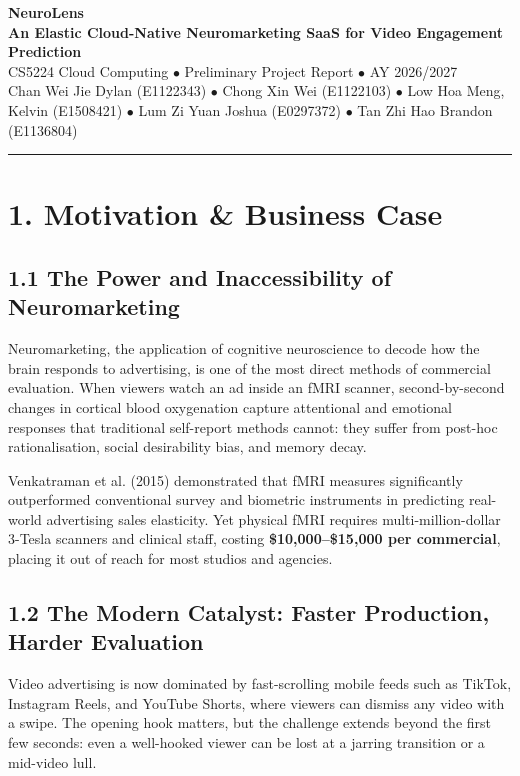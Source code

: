 \documentclass[10pt,a4paper]{article}
\begin{document}
\begin{center}
    {\LARGE \textbf{\textsf{NeuroLens}}}\\[4pt]
    {\large \textbf{\textsf{\textcolor[HTML]{0284c7}{An Elastic Cloud-Native Neuromarketing SaaS for Video Engagement Prediction}}}}\\[6pt]
    {\footnotesize \textsf{\textcolor[HTML]{64748b}{CS5224 Cloud Computing $\bullet$ Preliminary Project Report $\bullet$ AY 2026/2027}}}\\[4pt]
    {\footnotesize \textsf{\textcolor[HTML]{64748b}{Chan Wei Jie Dylan (E1122343) $\bullet$ Chong Xin Wei (E1122103) $\bullet$ Low Hoa Meng, Kelvin (E1508421) $\bullet$ Lum Zi Yuan Joshua (E0297372) $\bullet$ Tan Zhi Hao Brandon (E1136804)}}}\\[2pt]
    \rule{\textwidth}{0.4pt}
\end{center}
\vspace{2mm}

\section*{\textsf{1. Motivation \& Business Case}}
\subsection*{\textsf{1.1 The Power and Inaccessibility of Neuromarketing}}
Neuromarketing, the application of cognitive neuroscience to decode how the brain responds to advertising, is one of the most direct methods of commercial evaluation. When viewers watch an ad inside an fMRI scanner, second-by-second changes in cortical blood oxygenation capture attentional and emotional responses that traditional self-report methods cannot: they suffer from post-hoc rationalisation, social desirability bias, and memory decay.

Venkatraman et al. (2015) demonstrated that fMRI measures significantly outperformed conventional survey and biometric instruments in predicting real-world advertising sales elasticity. Yet physical fMRI requires multi-million-dollar 3-Tesla scanners and clinical staff, costing \textbf{\$10,000--\$15,000 per commercial}, placing it out of reach for most studios and agencies.

\subsection*{\textsf{1.2 The Modern Catalyst: Faster Production, Harder Evaluation}}
Video advertising is now dominated by fast-scrolling mobile feeds such as TikTok, Instagram Reels, and YouTube Shorts, where viewers can dismiss any video with a swipe. The opening hook matters, but the challenge extends beyond the first few seconds: even a well-hooked viewer can be lost at a jarring transition or a mid-video lull.
\end{document}
